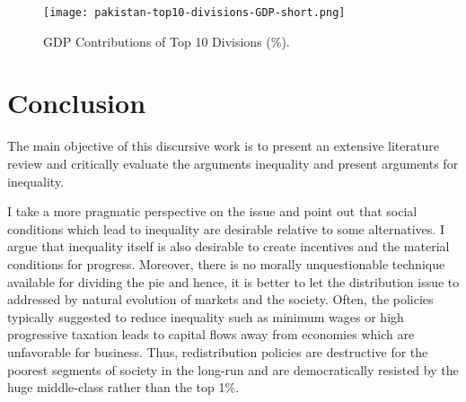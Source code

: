 \documentclass[12pt]{article}
\newcommand{\1}{\mathbbm 1}
\begin{document}
		 
		
		
		
		
		
		
		
		
		
		
		
		
		
	
		
	\begin{figure}[H] 
			\texttt{[image: pakistan-top10-divisions-GDP-short.png]}%
		\caption{GDP Contributions of Top 10 Divisions (\%).}
	\end{figure}
		
		
		
		
		
		
		
		
		
		
		
		
		
		
		
		
		
	
			
			
			
	
	 
		
		
	
		\section{Conclusion}
		
		
		The main objective of this discursive work is to present an extensive literature review and critically evaluate the arguments inequality and present arguments for inequality.
		
		 I take a more pragmatic perspective on the issue and point out that social conditions which lead to inequality are desirable relative to some alternatives. I argue that inequality itself is also desirable to create incentives and the material conditions for progress. Moreover, there is no morally unquestionable technique available for dividing the pie and hence, it is better to let the distribution issue to addressed by natural evolution of markets and the society. Often, the policies typically suggested to reduce inequality such as minimum wages or high progressive taxation leads to capital flows away from economies which are unfavorable for business. Thus, redistribution policies are destructive for the poorest segments of society in the long-run and are democratically resisted by the huge middle-class rather than the top 1\%. 
		
\end{document}
